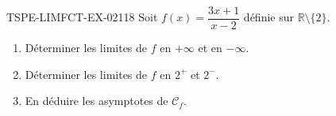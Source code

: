 \begin{exercice}{TSPE-LIMFCT-EX-021}{1}{8}
Soit $f(x) = \dfrac{3x+1}{x-2}$ définie sur $\mathbb{R} \setminus \{2\}$.
\begin{enumerate}
  \item Déterminer les limites de $f$ en $+\infty$ et en $-\infty$.
  \item Déterminer les limites de $f$ en $2^+$ et $2^-$.
  \item En déduire les asymptotes de $\mathcal{C}_f$.
\end{enumerate}
\end{exercice}
